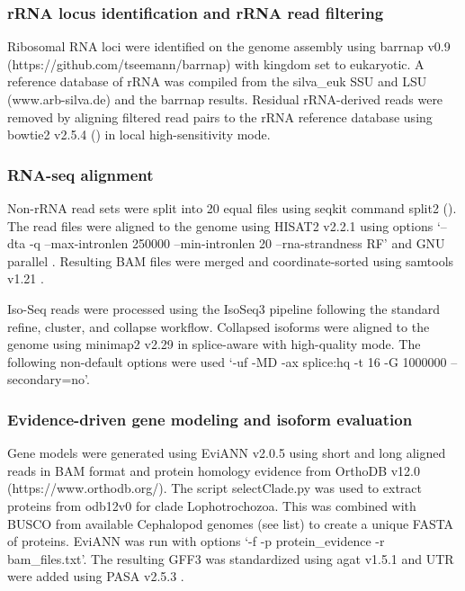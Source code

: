 \documentclass[11pt]{article}
\begin{document}
\subsubsection{rRNA locus identification and rRNA read filtering}

Ribosomal RNA loci were identified on the genome assembly using barrnap v0.9 (https://github.com/tseemann/barrnap) with kingdom set to eukaryotic. A reference database of rRNA was compiled from the silva\_euk SSU and LSU (www.arb-silva.de) and the barrnap results. Residual rRNA-derived reads were removed by aligning filtered read pairs to the rRNA reference database using bowtie2 v2.5.4 (\cite{Langmeadbt2}) in local high-sensitivity mode.

\subsubsection{RNA-seq alignment}

Non-rRNA read sets were split into 20 equal files using seqkit command split2 (\cite{Shen2016SeqKit}). The read files were aligned to the genome using HISAT2 v2.2.1 \cite{Kim2019HISAT2} using options ‘–dta -q –max-intronlen 250000 –min-intronlen 20 –rna-strandness RF’ and GNU parallel \cite{Tange2018Parallel}. Resulting BAM files were merged and coordinate-sorted using samtools v1.21 \cite{Danecek2021SAMtools}.

Iso-Seq reads were processed using the IsoSeq3 pipeline following the standard refine, cluster, and collapse workflow. Collapsed isoforms were aligned to the genome using minimap2 v2.29 \cite{Li2018} in splice-aware with high-quality mode. The following non-default options were used ‘-uf -MD -ax splice:hq -t 16 -G 1000000 --secondary=no’.

\subsubsection{Evidence-driven gene modeling and isoform evaluation}

Gene models were generated using EviANN v2.0.5 \cite{Petersen2025EviAnn} using short and long aligned reads in BAM format and protein homology evidence from OrthoDB v12.0 (https://www.orthodb.org/). The script selectClade.py was used to extract proteins from odb12v0 for clade Lophotrochozoa. This was combined with BUSCO from available Cephalopod genomes (see list) to create a unique FASTA of proteins. EviANN was run with options ‘-f -p protein\_evidence -r bam\_files.txt’. The resulting GFF3 was standardized using agat v1.5.1 \cite{DainatAGATZenodo} and UTR were added using PASA v2.5.3 \cite{Haas2003PASA}. 
\end{document}
